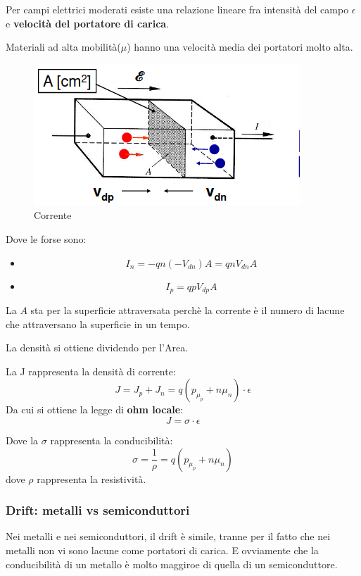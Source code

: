 Per campi elettrici moderati esiste una relazione lineare fra intensità del campo
$\epsilon$ e \textbf{velocità del portatore di carica}.

Materiali ad alta mobilità($\mu$) hanno una velocità media dei portatori molto alta.


\begin{figure}[H]
    \centering
    \includegraphics[width=0.3\linewidth]{imgs/corrente}
    \caption{Corrente}
    \label{fig:corrente}
\end{figure}

Dove le forse sono:
\begin{itemize}
    \item
        \begin{equation*}
            I_n = -qn(-V_{dn})A = qnV_{dn}A
        \end{equation*}
    \item
        \begin{equation*}
            I_p = qpV_{dp}A
        \end{equation*}
\end{itemize}

La $A$ sta per la superficie attraversata perchè la corrente è il numero di lacune che attraversano la superficie in un 
tempo.

La densità si ottiene dividendo per l'Area.

La J rappresenta la densità di corrente:
\begin{equation*}
    J = J_p + J_n = q(p_\mu_p + n\mu_n)\cdot \epsilon
\end{equation*}
Da cui si ottiene la legge di \textbf{ohm locale}:
\begin{equation*}
    J = \sigma \cdot \epsilon
\end{equation*}

Dove la $\sigma$ rappresenta la conducibilità:
\begin{equation}
    \sigma = \frac{1}{\rho} = q(p_\mu_p + n\mu_n)
\end{equation}
dove $\rho$ rappresenta la resistività.

\subsubsection{Drift: metalli vs semiconduttori}
Nei metalli e nei semiconduttori, il drift è simile, tranne per il fatto che nei metalli non vi sono lacune come
portatori di carica.
E ovviamente che la conducibilità di un metallo è molto maggiroe di quella di un semiconduttore.


